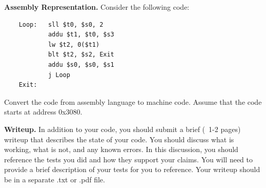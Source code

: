 \documentclass{exam}
\begin{document}
\begin{questions}

\question[10]
\textbf{Assembly Representation.}
Consider the following code:
\begin{verbatim}
    Loop:   sll $t0, $s0, 2 	
            addu $t1, $t0, $s3 	
            lw $t2, 0($t1) 
            blt $t2, $s2, Exit 
            addu $s0, $s0, $s1 
            j Loop 
    Exit:
\end{verbatim}
Convert the code from assembly language to machine code. 
Assume that the code starts at address 0x3080. 

\question[10]
\textbf{Writeup.}
In addition to your code, you should submit a brief (~1-2 pages) writeup that describes the state of your code. 
You should discuss what is working, what is not, and any known errors. 
In this discussion, you should reference the tests you did and how they support your claims. 
You will need to provide a brief description of your tests for you to reference. 
Your writeup should be in a separate .txt or .pdf file. 

\end{questions}
\end{document}
